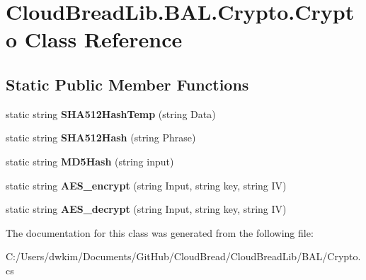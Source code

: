 \hypertarget{class_cloud_bread_lib_1_1_b_a_l_1_1_crypto_1_1_crypto}{}\section{Cloud\+Bread\+Lib.\+B\+A\+L.\+Crypto.\+Crypto Class Reference}
\label{class_cloud_bread_lib_1_1_b_a_l_1_1_crypto_1_1_crypto}
\subsection*{Static Public Member Functions}
\begin{DoxyCompactItemize}
\item 
static string {\bfseries S\+H\+A512\+Hash\+Temp} (string Data)\hypertarget{class_cloud_bread_lib_1_1_b_a_l_1_1_crypto_1_1_crypto_a9e3bcd89fcf615211a3b130da12f303b}{}\label{class_cloud_bread_lib_1_1_b_a_l_1_1_crypto_1_1_crypto_a9e3bcd89fcf615211a3b130da12f303b}

\item 
static string {\bfseries S\+H\+A512\+Hash} (string Phrase)\hypertarget{class_cloud_bread_lib_1_1_b_a_l_1_1_crypto_1_1_crypto_a8fdf4f7ed36ccc7c4f06c24694be91a1}{}\label{class_cloud_bread_lib_1_1_b_a_l_1_1_crypto_1_1_crypto_a8fdf4f7ed36ccc7c4f06c24694be91a1}

\item 
static string {\bfseries M\+D5\+Hash} (string input)\hypertarget{class_cloud_bread_lib_1_1_b_a_l_1_1_crypto_1_1_crypto_a12caf024bb8996c2808bfc4885a9c9d4}{}\label{class_cloud_bread_lib_1_1_b_a_l_1_1_crypto_1_1_crypto_a12caf024bb8996c2808bfc4885a9c9d4}

\item 
static string {\bfseries A\+E\+S\+\_\+encrypt} (string Input, string key, string IV)\hypertarget{class_cloud_bread_lib_1_1_b_a_l_1_1_crypto_1_1_crypto_ae26608c3c151fe4b37af07553248156f}{}\label{class_cloud_bread_lib_1_1_b_a_l_1_1_crypto_1_1_crypto_ae26608c3c151fe4b37af07553248156f}

\item 
static string {\bfseries A\+E\+S\+\_\+decrypt} (string Input, string key, string IV)\hypertarget{class_cloud_bread_lib_1_1_b_a_l_1_1_crypto_1_1_crypto_a325a57ed3041b30afbe1f484f92d38be}{}\label{class_cloud_bread_lib_1_1_b_a_l_1_1_crypto_1_1_crypto_a325a57ed3041b30afbe1f484f92d38be}

\end{DoxyCompactItemize}


The documentation for this class was generated from the following file\+:\begin{DoxyCompactItemize}
\item 
C\+:/\+Users/dwkim/\+Documents/\+Git\+Hub/\+Cloud\+Bread/\+Cloud\+Bread\+Lib/\+B\+A\+L/Crypto.\+cs\end{DoxyCompactItemize}
